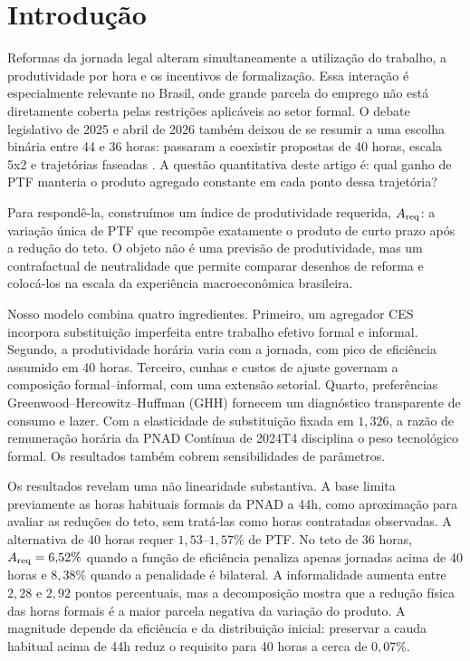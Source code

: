 \section{Introdu\c{c}\~ao}\label{sec:intro}

Reformas da jornada legal alteram simultaneamente a utiliza\c{c}\~ao do trabalho, a produtividade por hora e os incentivos de formaliza\c{c}\~ao. Essa intera\c{c}\~ao \'e especialmente relevante no Brasil, onde grande parcela do emprego n\~ao est\'a diretamente coberta pelas restri\c{c}\~oes aplic\'aveis ao setor formal. O debate legislativo de 2025 e abril de 2026 tamb\'em deixou de se resumir a uma escolha bin\'aria entre 44 e 36 horas: passaram a coexistir propostas de 40 horas, escala 5x2 e trajet\'orias faseadas \citep{CamaraPEC82025Protocol,CamaraFortyHours2025,CamaraFortyHoursBill2026}. A quest\~ao quantitativa deste artigo \'e: qual ganho de PTF manteria o produto agregado constante em cada ponto dessa trajet\'oria?

Para respond\^e-la, constru\'imos um \'indice de produtividade requerida, $A_{\mathrm{req}}$: a varia\c{c}\~ao \'unica de PTF que recomp\~oe exatamente o produto de curto prazo ap\'os a redu\c{c}\~ao do teto. O objeto n\~ao \'e uma previs\~ao de produtividade, mas um contrafactual de neutralidade que permite comparar desenhos de reforma e coloc\'a-los na escala da experi\^encia macroecon\^omica brasileira.

Nosso modelo combina quatro ingredientes. Primeiro, um agregador CES incorpora substitui\c{c}\~ao imperfeita entre trabalho efetivo formal e informal. Segundo, a produtividade hor\'aria varia com a jornada, com pico de efici\^encia assumido em 40 horas. Terceiro, cunhas e custos de ajuste governam a composi\c{c}\~ao formal--informal, com uma extens\~ao setorial. Quarto, prefer\^encias Greenwood--Hercowitz--Huffman (GHH) fornecem um diagn\'ostico transparente de consumo e lazer. Com a elasticidade de substitui\c{c}\~ao fixada em $1{,}326$, a raz\~ao de remunera\c{c}\~ao hor\'aria da PNAD Cont\'inua de 2024T4 disciplina o peso tecnol\'ogico formal. Os resultados tamb\'em cobrem sensibilidades de par\^ametros.

Os resultados revelam uma n\~ao linearidade substantiva. A base limita previamente as horas habituais formais da PNAD a 44h, como aproxima\c{c}\~ao para avaliar as redu\c{c}\~oes do teto, sem trat\'a-las como horas contratadas observadas. A alternativa de 40 horas requer $1{,}53$--$1{,}57\%$ de PTF. No teto de 36 horas, $A_{\mathrm{req}}=6{,}52\%$ quando a fun\c{c}\~ao de efici\^encia penaliza apenas jornadas acima de 40 horas e $8{,}38\%$ quando a penalidade \'e bilateral. A informalidade aumenta entre $2{,}28$ e $2{,}92$ pontos percentuais, mas a decomposi\c{c}\~ao mostra que a redu\c{c}\~ao f\'isica das horas formais \'e a maior parcela negativa da varia\c{c}\~ao do produto. A magnitude depende da efici\^encia e da distribui\c{c}\~ao inicial: preservar a cauda habitual acima de 44h reduz o requisito para 40 horas a cerca de $0{,}07\%$.

